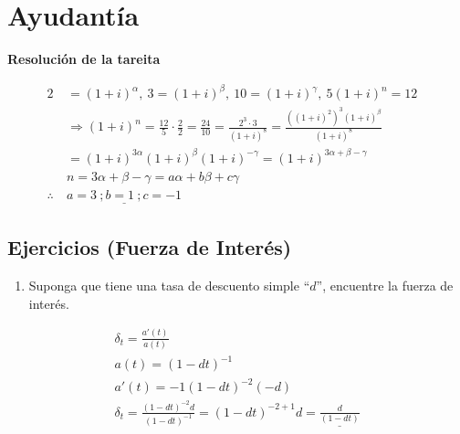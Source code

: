 \documentclass[
]{book}
\providecommand{\tightlist}{%
  \setlength{\itemsep}{0pt}\setlength{\parskip}{0pt}}
\theoremstyle{definition}
\theoremstyle{definition}
\theoremstyle{definition}
\theoremstyle{definition}
\theoremstyle{remark}
\begin{document}
\hypertarget{ayudantuxeda-2}{%
\section{Ayudantía}\label{ayudantuxeda-2}}

\textbf{Resolución de la tareita}

\begin{align*}
2 &= (1+i)^{\alpha}, \: 3 = (1+i)^{\beta}, \: 10 = (1+i)^{\gamma}, \: 5(1+i)^n = 12 &\\
& \Longrightarrow (1+i)^n = \frac{12}{5}\cdot \frac{2}{2} = \frac{24}{10} = \frac{2^3\cdot 3}{(1+i)^8} = \frac{\left( (1+i)^2 \right)^3 (1+i)^{\beta} }{(1+i)^8}&\\
& = (1+i)^{3\alpha}(1+i)^{\beta} (1+i)^{-\gamma} = (1+i)^{3\alpha + \beta -\gamma}&\\
& n = 3\alpha + \beta - \gamma = a\alpha + b \beta +c \gamma &\\
\therefore \: & \underline{a=3 \: ; b=1 \: ; c = -1}
\end{align*}

\hypertarget{ejercicios-fuerza-de-interuxe9s}{%
\subsection{Ejercicios (Fuerza de Interés)}\label{ejercicios-fuerza-de-interuxe9s}}

\begin{enumerate}
\def\labelenumi{\arabic{enumi}.}
\tightlist
\item
  Suponga que tiene una tasa de descuento simple ``\(d\)'', encuentre la fuerza de interés.
\end{enumerate}

\begin{align*}
&\delta_t = \frac{a'(t)}{a(t)}&\\
& a(t) = (1-dt)^{-1}\\
& a'(t) = -1(1-dt)^{-2}(-d)\\
& \delta_t = \frac{(1-dt)^{-2}d}{(1-dt)^{-1}} = (1-dt)^{-2+1}d = \underline{\frac{d}{(1-dt)}}
\end{align*}
\end{document}
